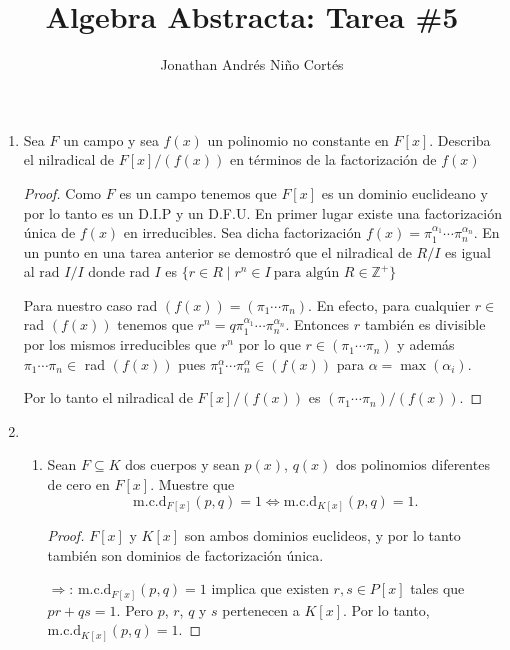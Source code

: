 \documentclass[letter,twoside,12pt]{article}
\title{Algebra Abstracta: Tarea \#5}
\author{Jonathan Andrés Niño Cortés}
\begin{document}
\maketitle

\begin{enumerate}
\item Sea $ F $ un campo y sea $ f(x) $ un polinomio no constante en $ F[x] $. Describa el nilradical de $ F[x]/(f(x)) $ en términos de la factorización de $ f(x) $

\begin{proof}
Como $ F $ es un campo tenemos que $ F[x] $ es un dominio euclideano y por lo tanto es un D.I.P y un D.F.U. En primer lugar existe una factorización única de $ f(x) $ en irreducibles. Sea dicha factorización $ f(x)=\pi_1^{\alpha_1} \cdots \pi_n^{\alpha_n} $. En un punto en una tarea anterior se demostró que el nilradical de $R/I$ es igual al $ \text{rad } I /I$ donde rad $ I $ es $ \{r \in R\;|\; r^n \in I\ \text{para algún } R \in \mathbb{Z}^+\} $

Para nuestro caso rad $(f(x)) = (\pi_1\cdots \pi_n)$. En efecto, para cualquier $ r \in  $ rad $ (f(x)) $ tenemos que $ r^n = q\pi_1^{\alpha_1} \cdots \pi_n^{\alpha_n}$. Entonces $r$ también es divisible por los mismos irreducibles que $r^n$ por lo que $ r \in (\pi_1 \cdots \pi_n) $ y además $ \pi_1 \cdots \pi_n \in  $ rad $ (f(x)) $ pues  $ \pi_1^{\alpha} \cdots \pi_n ^\alpha \in (f(x))$ para $ \alpha = \max(\alpha_i)$. 

Por lo tanto el nilradical de $ F[x]/(f(x)) $ es $ (\pi_1\cdots \pi_n)/(f(x)) $.
\end{proof}

\item \begin{enumerate}
\item Sean $ F \subseteq K $ dos cuerpos y sean $ p(x) $, $ q(x) $ dos polinomios diferentes de cero en $ F[x] $. Muestre que
\begin{equation}
\text{m.c.d}_{F [x]}(p, q) = 1 \Longleftrightarrow \text{m.c.d}_{K[x]}(p, q) = 1. \nonumber
\end{equation}
\begin{proof}

$ F[x] $ y $ K[x] $ son ambos dominios euclideos, y por lo tanto también son dominios de factorización única.

$ \Rightarrow $: $ \text{m.c.d}_{F [x]}(p, q) = 1 $ implica que existen $ r, s  \in P[x]$ tales que $ pr+qs=1$. Pero $ p $, $ r $, $ q $ y $ s $ pertenecen a $ K[x] $. Por lo tanto, $ \text{m.c.d}_{K [x]}(p, q) = 1 $.


\end{proof}
\end{enumerate}
\end{enumerate}
\end{document}

